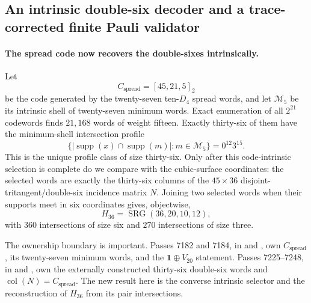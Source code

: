 \subsection{An intrinsic double-six decoder and a trace-corrected finite Pauli validator}
\label{sec:pass7305-7320-intrinsic-naimark-pauli-scope}

\paragraph{The spread code now recovers the double-sixes intrinsically.}
Let
\[
 C_{\mathrm{spread}}=[45,21,5]_2
\]
be the code generated by the twenty-seven ten-$D_4$ spread words, and let
$\mathcal M_5$ be its intrinsic shell of twenty-seven minimum words.  Exact
enumeration of all $2^{21}$ codewords finds $21{,}168$ words of weight fifteen.
Exactly thirty-six of them have the minimum-shell intersection profile
\[
 \boxed{\bigl\{|\operatorname{supp}(x)\cap\operatorname{supp}(m)|:
 m\in\mathcal M_5\bigr\}=0^{12}3^{15}.}
\]
This is the unique profile class of size thirty-six.  Only after this
code-intrinsic selection is complete do we compare with the cubic-surface
coordinates: the selected words are exactly the thirty-six columns of the
$45\times36$ disjoint-tritangent/double-six incidence matrix $N$.  Joining two
selected words when their supports meet in six coordinates gives, objectwise,
\[
 \boxed{H_{36}=\operatorname{SRG}(36,20,10,12)},
\]
with $360$ intersections of size six and $270$ intersections of size three.

The ownership boundary is important.  Passes 7182 and 7184, in
 and
, own
$C_{\mathrm{spread}}$, its twenty-seven minimum words, and the
$\mathbf 1\oplus V_{20}$ statement.  Passes 7225--7248, in
 and
, own the
externally constructed thirty-six double-six words and
$\operatorname{col}(N)=C_{\mathrm{spread}}$.  The new result here is the
converse intrinsic selector and the reconstruction of $H_{36}$ from its pair
intersections.

